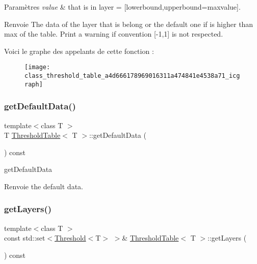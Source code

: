 \begin{DoxyParams}{Paramètres}
{\em value} & that is in layer = \mbox{[}lowerbound,upperbound=maxvalue\mbox{]}. \\
\hline
\end{DoxyParams}
\begin{DoxyReturn}{Renvoie}
The data of the layer that is belong or the default one if is higher than max of the table. Print a warning if convention \mbox{[}-\/1,1\mbox{]} is not respected. 
\end{DoxyReturn}
Voici le graphe des appelants de cette fonction \+:
\nopagebreak
\begin{figure}[H]
\begin{center}
\leavevmode
\texttt{[image: class\_threshold\_table\_a4d666178969016311a474841e4538a71\_icgraph]}
\end{center}
\end{figure}
\mbox{\label{class_threshold_table_a8db6671717f413e500301520310ccc74}} 
\subsubsection{\texorpdfstring{get\+Default\+Data()}{getDefaultData()}}
{\footnotesize\ttfamily template$<$class T $>$ \\
T \hyperlink{class_threshold_table}{Threshold\+Table}$<$ T $>$\+::get\+Default\+Data (\begin{DoxyParamCaption}{ }\end{DoxyParamCaption}) const\hspace{0.3cm}{\ttfamily [inline]}}



get\+Default\+Data 

\begin{DoxyReturn}{Renvoie}
the default data. 
\end{DoxyReturn}
\mbox{\label{class_threshold_table_a6cb1745a571a4e071e9b74ad34372405}} 
\subsubsection{\texorpdfstring{get\+Layers()}{getLayers()}}
{\footnotesize\ttfamily template$<$class T $>$ \\
const std\+::set$<$\hyperlink{struct_threshold}{Threshold}$<$T$>$ $>$\& \hyperlink{class_threshold_table}{Threshold\+Table}$<$ T $>$\+::get\+Layers (\begin{DoxyParamCaption}{ }\end{DoxyParamCaption}) const\hspace{0.3cm}{\ttfamily [inline]}}




